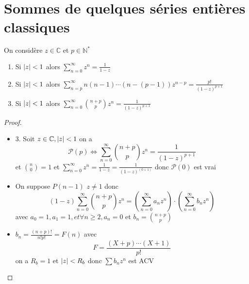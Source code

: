 \documentclass[11pt,hidelinks]{book}
\theoremstyle{mytheoremstyle}
\theoremstyle{mytheoremstyle}
\theoremstyle{mytheoremstyle}
\theoremstyle{mytheoremstyle}
\theoremstyle{mytheoremstyle}
\theoremstyle{mytheoremstyle}
\theoremstyle{mytheoremstyle}
\theoremstyle{mytheoremstyle}
\theoremstyle{myproblemstyle}
\def\mbb#1{\mathbb{#1}}
\def\mfc#1{\mathcal{#1}}
\def\bN{\mbb{N}}
\def\bC{\mbb{C}}
\def\is#1{\sum_{n=0}^\infty #1}
\def\iss#1#2{\sum_{n=#1}^\infty #2}
\def\seb#1{\sum #1_n z^n}
\newcommand{\parenth}[1]{\left(#1\right)}
\begin{document}
\section{Sommes de quelques séries entières classiques}
\begin{adjustwidth}{-2em}{-1em}
    \begin{prop}
        On considère $z \in \bC$ et $p \in \bN^*$
        \begin{enumerate} 
        \item Si $\abs{z} < 1$ alors $\is{z^n} = \frac{1}{1-z}$ 
        \item Si $\abs{z} < 1$ alors $\iss{p}{n(n-1)\cdots (n-(p-1))z^{n-p}} = \frac{p!}{(1-z)^{p+1}}$ 
        \item Si $\abs{z} < 1$ alors $\is{\binom{n+p}{p}z^n} = \frac{1}{(1-z)^{p+1}}$
        \end{enumerate}
        \begin{proof}$ $\newline
            \begin{itemize}[label=$\cdot$]
            \item 3. Soit $z \in \bC, \abs{z} < 1$ on a 
            \begin{equation*}
                \mfc{P}(p) \Leftrightarrow \is{\binom{n+p}{p}z^n} = \frac{1}{(1-z)^{p+1}}
            \end{equation*}
            et $\binom{n}{0} = 1$ et $\is{z^n} = \frac{1}{1-z} = \frac{1}{(1-z)^(0+1)}$ donc $\mfc{P}(0)$ est vrai 
             

            \item On suppose $P(n-1)$\newline
            $z \not= 1$ donc 
            \begin{equation*}
                (1-z)\is{\binom{n+p}{p}z^n} = \parenth{\is{a_nz^n}} \cdot \parenth{\is{b_nz^n}}
            \end{equation*}
            avec $a_0 = 1, a_1 = 1, et \forall n \geq 2, a_n = 0$ et $b_n = \binom{n+p}{p}$

            \item \begin{rmq}
                $b_n = \frac{(n+p)!}{n!p!} = F(n)$ avec
                \begin{equation*}
                F = \frac{(X+p)\cdots(X+1)}{p!}
                \end{equation*}
                on a $R_b = 1$ et $\abs{z} < R_b$ donc $\seb{b}$ est ACV
            \end{rmq}
            

\end{itemize}
\end{proof}
\end{prop}
\end{adjustwidth}
\end{document}
